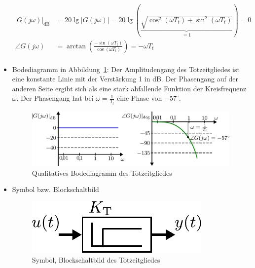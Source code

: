 \begin{itemize}
\begin{equation*}
\begin{aligned}
	|G(j\omega)|_{\text{dB}}&=20\lg|G(j\omega)|=20\lg\left(\underbrace{\sqrt{\cos^{2}(\omega T_{t})+\sin^{2}(\omega T_{t})}}_{=1}\right)=0\\
	\angle G(j\omega)&=\arctan\left(\frac{-\sin(\omega T_{t})}{\cos(\omega T_{t})}\right)=-\omega T_{t}\\
	\end{aligned}
	\end{equation*}
	\item Bodediagramm in Abbildung~\ref{fig:tgliedbode}: Der Amplitudengang des Totzeitgliedes ist eine konstante Linie mit der Verstärkung 1 in dB. Der Phasengang auf der anderen Seite ergibt sich als eine stark abfallende Funktion der Kreisfrequenz $\omega$. Der Phasengang hat bei $\omega=\frac{1}{T_{t}}$ eine Phase von $-57^{\circ}$.
	\begin{figure}[h]
		\centering
		\includegraphics[width=0.9\linewidth]{Abbildungen/Modellbildung/PDF/TgliedBode.pdf}
		\caption{Qualitatives Bodediagramm des Totzeitgliedes}
		\label{fig:tgliedbode}
	\end{figure}
	\item Symbol bzw. Blockschaltbild
	\begin{figure}[h]
		\centering
		\includegraphics[width=0.3\linewidth]{Abbildungen/Modellbildung/PDF/TgliedBlock.pdf}
		\caption{Symbol, Blockschaltbild des Totzeitgliedes}
		\label{fig:tglied}
	\end{figure}
\end{itemize}
%
